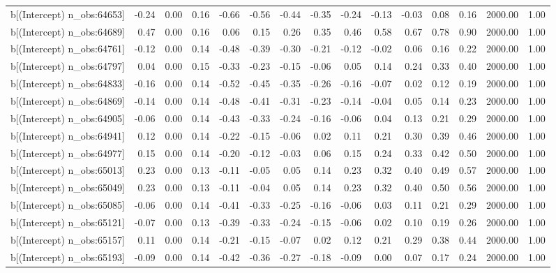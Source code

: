\begin{table}[ht]
\begin{tabular}{rrrrrrrrrrrrrrr}
  b[(Intercept) n\_obs:64653] & -0.24 & 0.00 & 0.16 & -0.66 & -0.56 & -0.44 & -0.35 & -0.24 & -0.13 & -0.03 & 0.08 & 0.16 & 2000.00 & 1.00 \\ 
  b[(Intercept) n\_obs:64689] & 0.47 & 0.00 & 0.16 & 0.06 & 0.15 & 0.26 & 0.35 & 0.46 & 0.58 & 0.67 & 0.78 & 0.90 & 2000.00 & 1.00 \\ 
  b[(Intercept) n\_obs:64761] & -0.12 & 0.00 & 0.14 & -0.48 & -0.39 & -0.30 & -0.21 & -0.12 & -0.02 & 0.06 & 0.16 & 0.22 & 2000.00 & 1.00 \\ 
  b[(Intercept) n\_obs:64797] & 0.04 & 0.00 & 0.15 & -0.33 & -0.23 & -0.15 & -0.06 & 0.05 & 0.14 & 0.24 & 0.33 & 0.40 & 2000.00 & 1.00 \\ 
  b[(Intercept) n\_obs:64833] & -0.16 & 0.00 & 0.14 & -0.52 & -0.45 & -0.35 & -0.26 & -0.16 & -0.07 & 0.02 & 0.12 & 0.19 & 2000.00 & 1.00 \\ 
  b[(Intercept) n\_obs:64869] & -0.14 & 0.00 & 0.14 & -0.48 & -0.41 & -0.31 & -0.23 & -0.14 & -0.04 & 0.05 & 0.14 & 0.23 & 2000.00 & 1.00 \\ 
  b[(Intercept) n\_obs:64905] & -0.06 & 0.00 & 0.14 & -0.43 & -0.33 & -0.24 & -0.16 & -0.06 & 0.04 & 0.13 & 0.21 & 0.29 & 2000.00 & 1.00 \\ 
  b[(Intercept) n\_obs:64941] & 0.12 & 0.00 & 0.14 & -0.22 & -0.15 & -0.06 & 0.02 & 0.11 & 0.21 & 0.30 & 0.39 & 0.46 & 2000.00 & 1.00 \\ 
  b[(Intercept) n\_obs:64977] & 0.15 & 0.00 & 0.14 & -0.20 & -0.12 & -0.03 & 0.06 & 0.15 & 0.24 & 0.33 & 0.42 & 0.50 & 2000.00 & 1.00 \\ 
  b[(Intercept) n\_obs:65013] & 0.23 & 0.00 & 0.13 & -0.11 & -0.05 & 0.05 & 0.14 & 0.23 & 0.32 & 0.40 & 0.49 & 0.57 & 2000.00 & 1.00 \\ 
  b[(Intercept) n\_obs:65049] & 0.23 & 0.00 & 0.13 & -0.11 & -0.04 & 0.05 & 0.14 & 0.23 & 0.32 & 0.40 & 0.50 & 0.56 & 2000.00 & 1.00 \\ 
  b[(Intercept) n\_obs:65085] & -0.06 & 0.00 & 0.14 & -0.41 & -0.33 & -0.25 & -0.16 & -0.06 & 0.03 & 0.11 & 0.21 & 0.29 & 2000.00 & 1.00 \\ 
  b[(Intercept) n\_obs:65121] & -0.07 & 0.00 & 0.13 & -0.39 & -0.33 & -0.24 & -0.15 & -0.06 & 0.02 & 0.10 & 0.19 & 0.26 & 2000.00 & 1.00 \\ 
  b[(Intercept) n\_obs:65157] & 0.11 & 0.00 & 0.14 & -0.21 & -0.15 & -0.07 & 0.02 & 0.12 & 0.21 & 0.29 & 0.38 & 0.44 & 2000.00 & 1.00 \\ 
  b[(Intercept) n\_obs:65193] & -0.09 & 0.00 & 0.14 & -0.42 & -0.36 & -0.27 & -0.18 & -0.09 & 0.00 & 0.07 & 0.17 & 0.24 & 2000.00 & 1.00 \\ 

\end{tabular}
\end{table}
